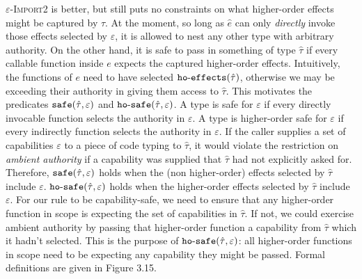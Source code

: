 \textsc{$\varepsilon$-Import2} is better, but still puts no constraints on what higher-order effects might be captured by $\hat \tau$. At the moment, so long as $\hat e$ can only \textit{directly} invoke those effects selected by $\varepsilon$, it is allowed to nest any other type with arbitrary authority. On the other hand, it is safe to pass in something of type $\hat \tau$ if every callable function inside $e$ expects the captured higher-order effects. Intuitively, the functions of $e$ need to have selected $\mathtt{ho \hbox{-} effects}(\hat \tau)$, otherwise we may be exceeding their authority in giving them access to $\hat \tau$. This motivates the predicates $\mathtt{safe}(\hat \tau, \varepsilon)$ and $\mathtt{ho \hbox{-} safe}(\hat \tau, \varepsilon)$. A type is safe for $\varepsilon$ if every directly invocable function selects the authority in $\varepsilon$. A type is higher-order safe for $\varepsilon$ if every indirectly function selects the authority in $\varepsilon$. If the caller supplies a set of capabilities $\varepsilon$ to a piece of code typing to $\hat \tau$, it would violate the restriction on \textit{ambient authority} if a capability was supplied that $\hat \tau$ had not explicitly asked for. Therefore, $\mathtt{safe}(\hat \tau, \varepsilon)$ holds when the (non higher-order) effects selected by $\hat \tau$ include $\varepsilon$. $\mathtt{ho \hbox{-} safe}(\hat \tau, \varepsilon)$ holds when the higher-order effects selected by $\hat  \tau$ include $\varepsilon$. For our rule to be capability-safe, we need to ensure that any higher-order function in scope is expecting the set of capabilities in $\hat \tau$. If not, we could exercise ambient authority by passing that higher-order function a capability from $\hat \tau$ which it hadn't selected. This is the purpose of $\mathtt{ho \hbox{-} safe}(\hat \tau, \varepsilon)$: all higher-order functions in scope need to be expecting any capability they might be passed. Formal definitions are given in Figure 3.15. 

